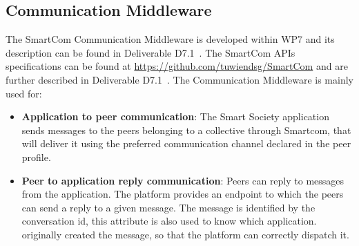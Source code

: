 \subsection{Communication Middleware}
The SmartCom Communication Middleware is developed within WP7 and its
description can be found in Deliverable D7.1~\cite{D7.1}. The SmartCom
APIs specifications can be found at 
\url{https://github.com/tuwiendsg/SmartCom} and are further described in Deliverable D7.1~\cite{D7.1}. The Communication Middleware is mainly used for:
\begin{itemize}
\item {\bf Application to peer communication}: The Smart Society application sends messages to the peers belonging to a collective through Smartcom, that will deliver it using the preferred communication channel declared in the peer profile.
\item {\bf Peer to application reply communication}: Peers can reply to messages from the application. The platform provides an endpoint to which the peers can send a reply to a given message. The message is identified by the conversation id, this attribute is also used to know which application.
originally created the message, so that the platform can correctly dispatch it. 
\end{itemize}

